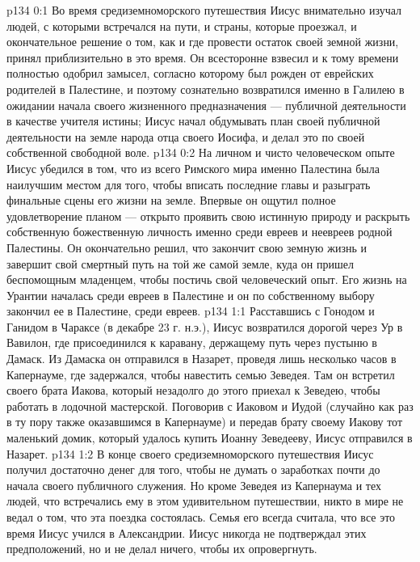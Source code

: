\author{Комиссия срединников}
\vs p134 0:1 Во время средиземноморского путешествия Иисус внимательно изучал людей, с которыми встречался на пути, и страны, которые проезжал, и окончательное решение о том, как и где провести остаток своей земной жизни, принял приблизительно в это время. Он всесторонне взвесил и к тому времени полностью одобрил замысел, согласно которому был рожден от еврейских родителей в Палестине, и поэтому сознательно возвратился именно в Галилею в ожидании начала своего жизненного предназначения --- публичной деятельности в качестве учителя истины; Иисус начал обдумывать план своей публичной деятельности на земле народа отца своего Иосифа, и делал это по своей собственной свободной воле.
\vs p134 0:2 На личном и чисто человеческом опыте Иисус убедился в том, что из всего Римского мира именно Палестина была наилучшим местом для того, чтобы вписать последние главы и разыграть финальные сцены его жизни на земле. Впервые он ощутил полное удовлетворение планом --- открыто проявить свою истинную природу и раскрыть собственную божественную личность именно среди евреев и неевреев родной Палестины. Он окончательно решил, что закончит свою земную жизнь и завершит свой смертный путь на той же самой земле, куда он пришел беспомощным младенцем, чтобы постичь свой человеческий опыт. Его жизнь на Урантии началась среди евреев в Палестине и он по собственному выбору закончил ее в Палестине, среди евреев.
\vs p134 1:1 Расставшись с Гонодом и Ганидом в Чараксе (в декабре 23 г. н.э.), Иисус возвратился дорогой через Ур в Вавилон, где присоединился к каравану, держащему путь через пустыню в Дамаск. Из Дамаска он отправился в Назарет, проведя лишь несколько часов в Капернауме, где задержался, чтобы навестить семью Зеведея. Там он встретил своего брата Иакова, который незадолго до этого приехал к Зеведею, чтобы работать в лодочной мастерской. Поговорив с Иаковом и Иудой (случайно как раз в ту пору также оказавшимся в Капернауме) и передав брату своему Иакову тот маленький домик, который удалось купить Иоанну Зеведееву, Иисус отправился в Назарет.
\vs p134 1:2 В конце своего средиземноморского путешествия Иисус получил достаточно денег для того, чтобы не думать о заработках почти до начала своего публичного служения. Но кроме Зеведея из Капернаума и тех людей, что встречались ему в этом удивительном путешествии, никто в мире не ведал о том, что эта поездка состоялась. Семья его всегда считала, что все это время Иисус учился в Александрии. Иисус никогда не подтверждал этих предположений, но и не делал ничего, чтобы их опровергнуть.
